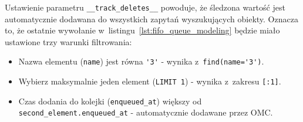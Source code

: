 Ustawienie parametru \verb+__track_deletes__+ powoduje, że śledzona wartość jest automatycznie dodawana do wszystkich zapytań wyszukujących obiekty. Oznacza to, że ostatnie wywołanie w~listingu~\ref{lst:fifo_queue_modeling} będzie miało ustawione trzy warunki filtrowania:

\begin{itemize}
	\item Nazwa elementu (\verb+name+) jest równa \verb+'3'+ - wynika z~\verb+find(name='3')+.
	\item Wybierz maksymalnie jeden element (\verb+LIMIT 1+) - wynika z~zakresu \verb+[:1]+.
	\item Czas dodania do kolejki (\verb+enqueued_at+) większy od \verb+second_element.enqueued_at+ - automatycznie dodawane przez OMC.
\end{itemize}


